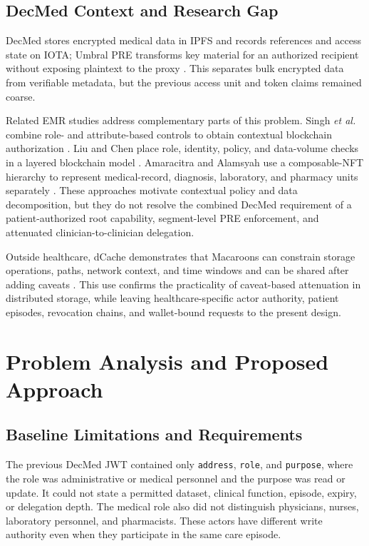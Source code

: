\subsection{DecMed Context and Research Gap}

DecMed stores encrypted medical data in IPFS and records references and access state on IOTA; Umbral PRE transforms key material for an authorized recipient without exposing plaintext to the proxy \cite{sadewa2025decmed,benet2014ipfs,nunez2017umbral}. This separates bulk encrypted data from verifiable metadata, but the previous access unit and token claims remained coarse.

Related EMR studies address complementary parts of this problem. Singh \emph{et al.} combine role- and attribute-based controls to obtain contextual blockchain authorization \cite{singh2025granular}. Liu and Chen place role, identity, policy, and data-volume checks in a layered blockchain model \cite{liu2025accesscontrol}. Amaracitra and Alamsyah use a composable-NFT hierarchy to represent medical-record, diagnosis, laboratory, and pharmacy units separately \cite{amaracitra2025composable}. These approaches motivate contextual policy and data decomposition, but they do not resolve the combined DecMed requirement of a patient-authorized root capability, segment-level PRE enforcement, and attenuated clinician-to-clinician delegation.

Outside healthcare, dCache demonstrates that Macaroons can constrain storage operations, paths, network context, and time windows and can be shared after adding caveats \cite{dcache_macaroons}. This use confirms the practicality of caveat-based attenuation in distributed storage, while leaving healthcare-specific actor authority, patient episodes, revocation chains, and wallet-bound requests to the present design.

\section{Problem Analysis and Proposed Approach}
\label{sec:approach}

\subsection{Baseline Limitations and Requirements}

The previous DecMed JWT contained only \texttt{address}, \texttt{role}, and \texttt{purpose}, where the role was administrative or medical personnel and the purpose was read or update. It could not state a permitted dataset, clinical function, episode, expiry, or delegation depth. The medical role also did not distinguish physicians, nurses, laboratory personnel, and pharmacists. These actors have different write authority even when they participate in the same care episode.

